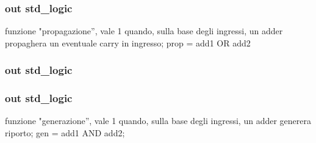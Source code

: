 \subsubsection[{\texorpdfstring{gen}{gen}}]{ {\bfseries \textcolor{vhdlchar}{out}\textcolor{vhdlchar}{ }} {\bfseries \textcolor{vhdlchar}{std\+\_\+logic}\textcolor{vhdlchar}{ }} \hspace{0.3cm}{\ttfamily [Port]}}\hypertarget{group___base_cell_gaad65a9c9ebd4dd83c2835249a1ba2dff}{}\label{group___base_cell_gaad65a9c9ebd4dd83c2835249a1ba2dff}
funzione "propagazione”, vale 1 quando, sulla base degli ingressi, un adder propaghera\textquotesingle{} un eventuale carry in ingresso; prop = add1 OR add2 
\subsubsection[{\texorpdfstring{prop}{prop}}]{ {\bfseries \textcolor{vhdlchar}{out}\textcolor{vhdlchar}{ }} {\bfseries \textcolor{vhdlchar}{std\+\_\+logic}\textcolor{vhdlchar}{ }} \hspace{0.3cm}{\ttfamily [Port]}}\hypertarget{group___base_cell_gac94466f3a0e3e34f0231abcf4b667ade}{}\label{group___base_cell_gac94466f3a0e3e34f0231abcf4b667ade}
\subsubsection[{\texorpdfstring{sum}{sum}}]{ {\bfseries \textcolor{vhdlchar}{out}\textcolor{vhdlchar}{ }} {\bfseries \textcolor{vhdlchar}{std\+\_\+logic}\textcolor{vhdlchar}{ }} \hspace{0.3cm}{\ttfamily [Port]}}\hypertarget{group___base_cell_ga0d9fc1b21b42422b12d68ad73ca8ef13}{}\label{group___base_cell_ga0d9fc1b21b42422b12d68ad73ca8ef13}
funzione "generazione”, vale 1 quando, sulla base degli ingressi, un adder generera\textquotesingle{} riporto; gen = add1 A\+ND add2; 